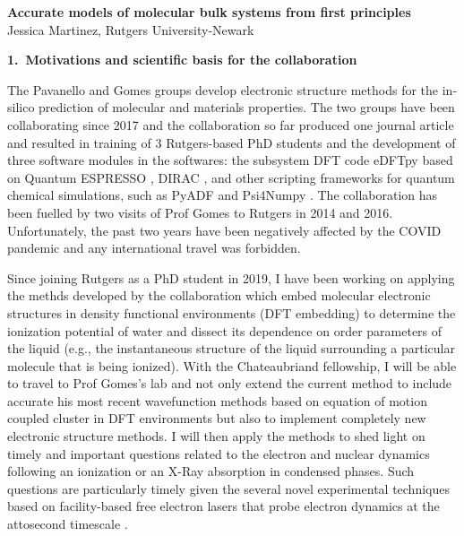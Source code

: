 \documentclass[notitlepage,12pt]{report}
\begin{document}
\renewcommand\Affilfont{\itshape\small}
\begin{center}
    \textbf{\LARGE Accurate models of molecular bulk systems from first principles}\\
    Jessica Martinez, Rutgers University-Newark
\end{center}

\textbf{\large 1.\ Motivations and scientific basis for the collaboration}

    The Pavanello and Gomes groups develop electronic structure methods for the in-silico prediction of molecular and materials properties. The two groups have been collaborating since 2017 and the collaboration so far produced one journal article \supercite{tolle2019charged} and resulted in training of 3 Rutgers-based PhD students and the development of three software modules in the softwares: the subsystem DFT code eDFTpy\supercite{edftpy} based on Quantum ESPRESSO \supercite{qe}, DIRAC \supercite{saue2020dirac}, and other scripting frameworks for quantum chemical simulations, such as PyADF \supercite{Jacob_2011} and Psi4Numpy \supercite{smith2018psi4numpy}. The collaboration has been fuelled by two visits of Prof Gomes to Rutgers in 2014 and 2016. Unfortunately, the past two years have been negatively affected by the COVID pandemic and any international travel was forbidden. 

    Since joining Rutgers as a PhD student in 2019, I have been working on applying the methds developed by the collaboration which embed molecular  electronic structures in density functional environments (DFT embedding) to determine the ionization potential of water and dissect its dependence on order parameters of the liquid (e.g., the instantaneous structure of  the liquid surrounding a particular molecule that is being ionized).  With the Chateaubriand fellowship, I will be able to travel to Prof Gomes's lab and not only extend the current method to include accurate his most recent wavefunction methods based on equation of motion coupled cluster in DFT environments but also to implement completely new electronic structure methods. I will then apply the methods to shed light on timely and important questions related to the electron and nuclear dynamics following an ionization or an X-Ray absorption in condensed phases. Such questions are particularly timely given the several novel experimental techniques based on facility-based free electron lasers that probe electron dynamics at the attosecond timescale \supercite{}.  
\end{document}
